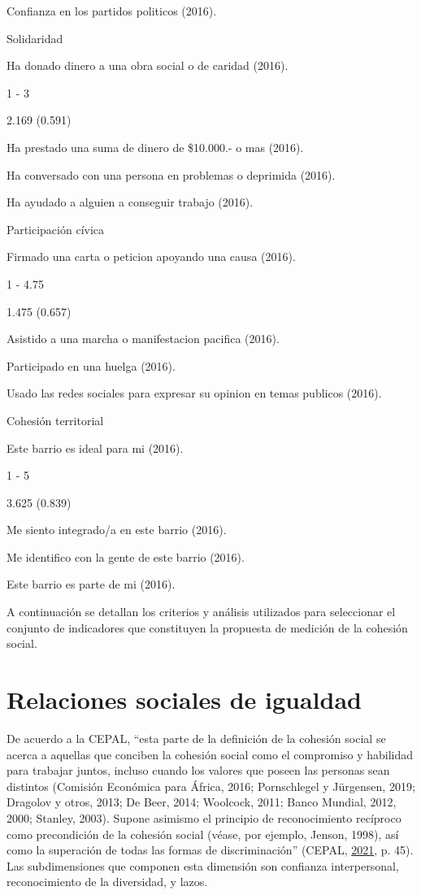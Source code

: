 \documentclass[
  12pt,
]{book}
\begin{document}
Confianza en los partidos politicos (2016).

Solidaridad

Ha donado dinero a una obra social o de caridad (2016).

1 - 3

2.169 (0.591)

Ha prestado una suma de dinero de \$10.000.- o mas (2016).

Ha conversado con una persona en problemas o deprimida (2016).

Ha ayudado a alguien a conseguir trabajo (2016).

Participación cívica

Firmado una carta o peticion apoyando una causa (2016).

1 - 4.75

1.475 (0.657)

Asistido a una marcha o manifestacion pacifica (2016).

Participado en una huelga (2016).

Usado las redes sociales para expresar su opinion en temas publicos (2016).

Cohesión territorial

Este barrio es ideal para mi (2016).

1 - 5

3.625 (0.839)

Me siento integrado/a en este barrio (2016).

Me identifico con la gente de este barrio (2016).

Este barrio es parte de mi (2016).

A continuación se detallan los criterios y análisis utilizados para seleccionar el conjunto de indicadores que constituyen la propuesta de medición de la cohesión social.

\hypertarget{relaciones-sociales-de-igualdad}{%
\section{Relaciones sociales de igualdad}\label{relaciones-sociales-de-igualdad}}

De acuerdo a la CEPAL, ``esta parte de la definición de la cohesión social se acerca a aquellas que conciben la cohesión social como el compromiso y habilidad para trabajar juntos, incluso cuando los valores que poseen las personas sean distintos (Comisión Económica para África, 2016; Pornschlegel y Jürgensen, 2019; Dragolov y otros, 2013; De Beer, 2014; Woolcock, 2011; Banco Mundial, 2012, 2000; Stanley, 2003). Supone asimismo el principio de reconocimiento recíproco como precondición de la cohesión social (véase, por ejemplo, Jenson, 1998), así como la superación de todas las formas de discriminación'' (CEPAL, \protect\hyperlink{ref-cepal_cohesion_2021}{2021}, p. 45). Las subdimensiones que componen esta dimensión son confianza interpersonal, reconocimiento de la diversidad, y lazos.
\end{document}

